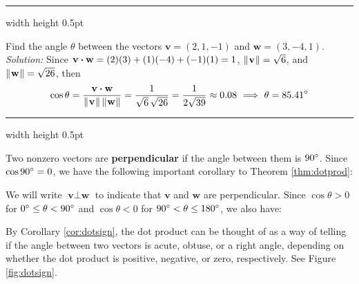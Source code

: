 \hrule width \textwidth height 0.5pt
\begin{exmp}
 Find the angle $\theta$ between the vectors $\textbf{v} = (2,1,-1)$ and $\textbf{w} =
 (3,-4,1)$.\vspace{2mm}\\\emph{Solution:}
 Since $\textbf{v} \bm{\cdot} \textbf{w} = (2)(3) + (1)(-4) + (-1)(1) = 1$,
 $\lVert\mspace{1mu}\textbf{v}\mspace{1mu}\rVert = \sqrt{6}$, and $\lVert\mspace{1mu}\textbf{w}\mspace{1mu}\rVert = \sqrt{26}$, then
 \begin{displaymath}
  \cos \theta = \frac{\textbf{v} \bm{\cdot} \textbf{w}}{\lVert\mspace{1mu}\textbf{v}\mspace{1mu}\rVert \, \lVert\mspace{1mu}\textbf{w}\mspace{1mu}\rVert} =
  \frac{1}{\sqrt{6}\,\sqrt{26}} = \frac{1}{2 \sqrt{39}} \approx 0.08 ~ \Longrightarrow ~ \theta = 85.41^\circ
 \end{displaymath}
\end{exmp}
\hrule width \textwidth height 0.5pt
\vspace{2mm}

Two nonzero vectors are \textbf{perpendicular} if the angle between them is $90^\circ$.
Since $\cos 90^\circ = 0$, we have the following important corollary to Theorem \ref{thm:dotprod}:

We will write $\textbf{v} \perp \textbf{w}$ to indicate that $\textbf{v}$ and $\textbf{w}$ are perpendicular.
\newpage
Since $\cos \theta > 0$ for $0^\circ \le \theta < 90^\circ$ and $\cos \theta < 0$ for
$90^\circ < \theta \le 180^\circ$, we also have:


By Corollary \ref{cor:dotsign}, the dot product can be thought of as a way of telling if the angle between two vectors
is acute, obtuse, or a right angle, depending on whether the dot product is positive, negative, or zero,
respectively. See Figure \ref{fig:dotsign}.

